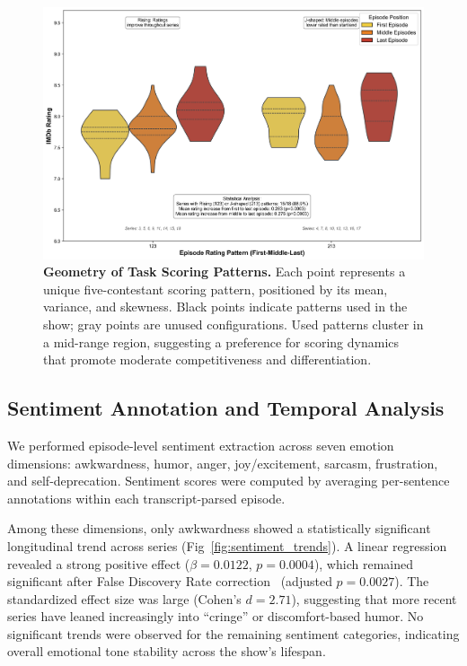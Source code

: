 \documentclass[10pt,letterpaper]{article}
\begin{document}
\begin{figure}[!h]
\centering
\includegraphics[width=\linewidth]{FiguresPNG/Fig8.png}
\caption{{\bf Geometry of Task Scoring Patterns.}
Each point represents a unique five-contestant scoring pattern, positioned by its mean, variance, and skewness. Black points indicate patterns used in the show; gray points are unused configurations. Used patterns cluster in a mid-range region, suggesting a preference for scoring dynamics that promote moderate competitiveness and differentiation.}
\label{fig:scoring_geometry}
\end{figure}
\FloatBarrier



\subsection*{Sentiment Annotation and Temporal Analysis}

We performed episode-level sentiment extraction across seven emotion dimensions: awkwardness, humor, anger, joy/excitement, sarcasm, frustration, and self-deprecation. Sentiment scores were computed by averaging per-sentence annotations within each transcript-parsed episode.

Among these dimensions, only awkwardness showed a statistically significant longitudinal trend across series (Fig~\ref{fig:sentiment_trends}). A linear regression revealed a strong positive effect ($\beta = 0.0122$, $p = 0.0004$), which remained significant after False Discovery Rate correction~\cite{Benjamini1995} (adjusted $p = 0.0027$). The standardized effect size was large (Cohen’s $d = 2.71$), suggesting that more recent series have leaned increasingly into “cringe” or discomfort-based humor. No significant trends were observed for the remaining sentiment categories, indicating overall emotional tone stability across the show’s lifespan.
\end{document}
